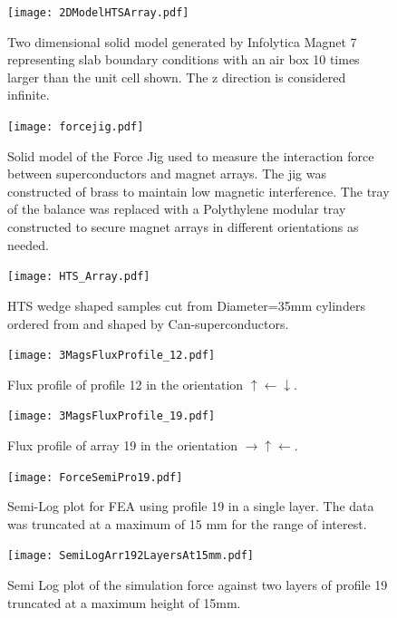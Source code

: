 \begin{figure}[htbp]
\centering
\texttt{[image: 2DModelHTSArray.pdf]}
\caption{Two dimensional solid model generated by Infolytica Magnet 7 representing slab boundary conditions with an air box 10 times larger than the unit cell shown.  The z direction is considered infinite.}
\label{fig_2DModel}
\end{figure}

\begin{figure}[htbp]
\centering
\texttt{[image: forcejig.pdf]}
\caption{Solid model of the Force Jig used to measure the interaction force between superconductors and magnet arrays.  The jig was constructed of brass to maintain low magnetic interference.  The tray of the balance was replaced with a Polythylene modular tray constructed to secure magnet arrays in different orientations as needed.}
\label{fig_forcejig}
\end{figure}

\begin{figure}[htbp]
\centering
\texttt{[image: HTS\_Array.pdf]}
\caption{HTS wedge shaped samples cut from Diameter=35mm cylinders ordered from and shaped by Can-superconductors.}
\label{fig_HTS_Samples}
\end{figure}

\begin{figure}[htbp]
\centering
\texttt{[image: 3MagsFluxProfile\_12.pdf]}
\caption{Flux profile of profile 12 in the orientation $\uparrow \leftarrow \downarrow$.}
\label{fig_fluxprofile_12}
\end{figure}

\begin{figure}[htbp]
\centering
\texttt{[image: 3MagsFluxProfile\_19.pdf]}
\caption{Flux profile of array 19 in the orientation $\rightarrow \uparrow \leftarrow$.}
\label{fig_fluxprofile_19}
\end{figure}

\begin{figure}[htbp]
\centering
\texttt{[image: ForceSemiPro19.pdf]}
\caption{Semi-Log plot for FEA using profile 19 in a single layer.  The data was truncated at a maximum of 15 mm for the range of interest.}
\label{fig_force19_one}
\end{figure}

\begin{figure}[htbp]
\centering
\texttt{[image: SemiLogArr192LayersAt15mm.pdf]}
\caption{Semi Log plot of the simulation force against two layers of profile 19 truncated at a maximum height of 15mm.}
\label{fig_force19_two}
\end{figure}

